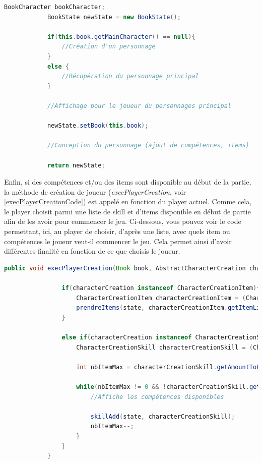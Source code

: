 		\begin{lstlisting}[language=java, caption=createNewState()]
			BookCharacter bookCharacter;
			BookState newState = new BookState();

			if(this.book.getMainCharacter() == null){
				//Création d'un personnage
			}
			else {
				//Récupération du personnage principal
			}

			//Affichage pour le joueur du personnages principal

			newState.setBook(this.book);

			//Conception du personnage (ajout de compétences, items)

			return newState;
		\end{lstlisting}

		Enfin, si des compétences et/ou des items sont disponible au début de la partie, la méthode de création de joueur (\textit{execPlayerCreation}, voir \ref{execPlayerCreationCode}) est appelé en fonction du player actuel. Comme cela, le player choisit parmi une liste de skill et d'items disponible en début de partie afin de les avoir pour commencer le jeu. Ci-dessous, vous pouvez voir le code permettant, ici, au player de choisir, d'après une liste, avec quels item ou compétences le joueur veut-il commencer le jeu. Cela permet ainsi d'avoir différentes finalité en fonction de ce que choisis le joueur.\\

		\begin{lstlisting}[language=java, caption=Méthode execPlayerCreation() du player]
		public void execPlayerCreation(Book book, AbstractCharacterCreation characterCreation, BookState state){

				if(characterCreation instanceof CharacterCreationItem){
					CharacterCreationItem characterCreationItem = (CharacterCreationItem) characterCreation;
					prendreItems(state, characterCreationItem.getItemLinks(), characterCreationItem.getAmountToPick());
				}

				else if(characterCreation instanceof CharacterCreationSkill){
					CharacterCreationSkill characterCreationSkill = (CharacterCreationSkill) characterCreation;

					int nbItemMax = characterCreationSkill.getAmountToPick();

					while(nbItemMax != 0 && !characterCreationSkill.getSkillLinks().isEmpty()){
						//Affiche les compétences disponibles

						skillAdd(state, characterCreationSkill);
						nbItemMax--;
					}
				}
			}
		\end{lstlisting}

